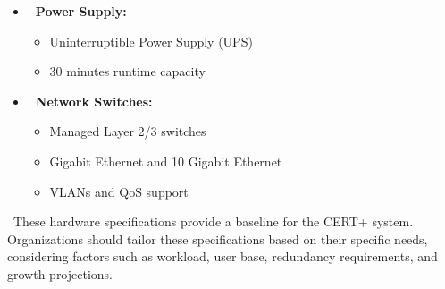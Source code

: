 \documentclass[10pt]{report}
\begin{document}
{\begin{itemize}[label=--]
  \item \textbf{\ Power Supply:}
  \begin{itemize}
      \item Uninterruptible Power Supply (UPS)
      \item 30 minutes runtime capacity
  \end{itemize}
  
  \item \textbf{\ Network Switches:}
  \begin{itemize}
      \item Managed Layer 2/3 switches
      \item Gigabit Ethernet and 10 Gigabit Ethernet
      \item VLANs and QoS support
  \end{itemize}
\end{itemize}

\ These hardware specifications provide a baseline for the CERT+ system. Organizations should tailor these specifications based on their specific needs, considering factors such as workload, user base, redundancy requirements, and growth projections.
}
\end{document}
